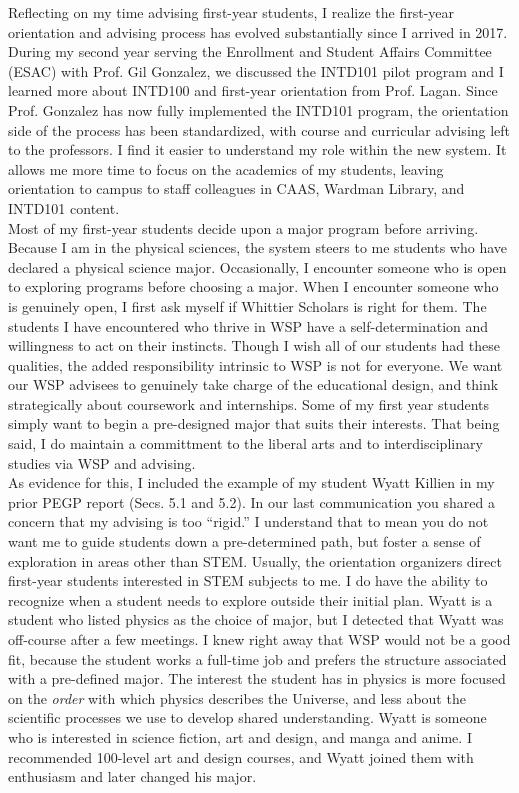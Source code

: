 \documentclass[../../main.tex]{subfiles}
\begin{document}
Reflecting on my time advising first-year students, I realize the first-year orientation and advising process has evolved substantially since I arrived in 2017.  During my second year serving the Enrollment and Student Affairs Committee (ESAC) with Prof. Gil Gonzalez, we discussed the INTD101 pilot program and I learned more about INTD100 and first-year orientation from Prof. Lagan.  Since Prof. Gonzalez has now fully implemented the INTD101 program, the orientation side of the process has been standardized, with course and curricular advising left to the professors.  I find it easier to understand my role within the new system.  It allows me more time to focus on the academics of my students, leaving orientation to campus to staff colleagues in CAAS, Wardman Library, and INTD101 content.  
\\
\vspace{0.15cm}
Most of my first-year students decide upon a major program before arriving.  Because I am in the physical sciences, the system steers to me students who have declared a physical science major.  Occasionally, I encounter someone who is open to exploring programs before choosing a major.  When I encounter someone who is genuinely open, I first ask myself if Whittier Scholars is right for them.  The students I have encountered who thrive in WSP have a self-determination and willingness to act on their instincts.  Though I wish all of our students had these qualities, the added responsibility intrinsic to WSP is not for everyone.  We want our WSP advisees to genuinely take charge of the educational design, and think strategically about coursework and internships.  Some of my first year students simply want to begin a pre-designed major that suits their interests.  That being said, I do maintain a committment to the liberal arts and to interdisciplinary studies via WSP and advising.
\\
\vspace{0.15cm}
As evidence for this, I included the example of my student Wyatt Killien in my prior PEGP report (Secs. 5.1 and 5.2).  In our last communication you shared a concern that my advising is too ``rigid.''  I understand that to mean you do not want me to guide students down a pre-determined path, but foster a sense of exploration in areas other than STEM.  Usually, the orientation organizers direct first-year students interested in STEM subjects to me.  I do have the ability to recognize when a student needs to explore outside their initial plan.  Wyatt is a student who listed physics as the choice of major, but I detected that Wyatt was off-course after a few meetings.  I knew right away that WSP would not be a good fit, because the student works a full-time job and prefers the structure associated with a pre-defined major.  The interest the student has in physics is more focused on the \textit{order} with which physics describes the Universe, and less about the scientific processes we use to develop shared understanding.  Wyatt is someone who is interested in science fiction, art and design, and manga and anime.  I recommended 100-level art and design courses, and Wyatt joined them with enthusiasm and later changed his major.  
\end{document}
